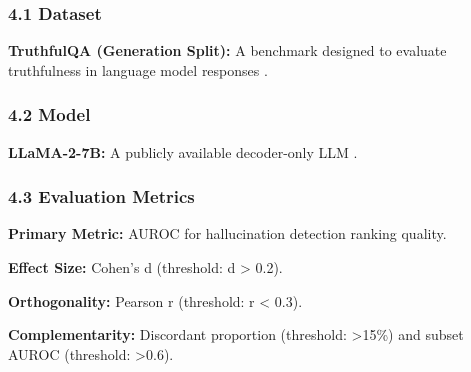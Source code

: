 
\subsubsection{4.1 Dataset}

\textbf{TruthfulQA (Generation Split):} A benchmark designed to evaluate truthfulness in language model responses \citep{lin2022truthfulqa}.

\begin{table}[htbp]
\centering
{}
\end{table}

\subsubsection{4.2 Model}

\textbf{LLaMA-2-7B:} A publicly available decoder-only LLM \citep{Meta2023}.

\begin{table}[htbp]
\centering
{}
\end{table}

\subsubsection{4.3 Evaluation Metrics}

\textbf{Primary Metric:} AUROC for hallucination detection ranking quality.

\textbf{Effect Size:} Cohen's d (threshold: d > 0.2).

\textbf{Orthogonality:} Pearson r (threshold: r < 0.3).

\textbf{Complementarity:} Discordant proportion (threshold: >15\%) and subset AUROC (threshold: >0.6).


